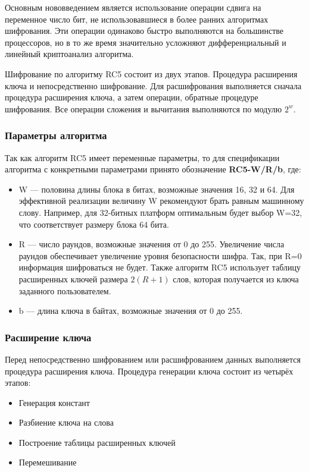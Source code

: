 \documentclass[a4paper]{report}
\begin{document}
Основным нововведением является использование операции сдвига на переменное число бит, не использовавшиеся в более ранних алгоритмах шифрования. Эти операции одинаково быстро выполняются на большинстве процессоров, но в то же время значительно усложняют дифференциальный и линейный криптоанализ алгоритма.

Шифрование по алгоритму RC5 состоит из двух этапов. Процедура расширения ключа и непосредственно шифрование. Для расшифрования выполняется сначала процедура расширения ключа, а затем операции, обратные процедуре шифрования. Все операции сложения и вычитания выполняются по модулю $\displaystyle 2^{w}$. 

\subsubsection{Параметры алгоритма}
Так как алгоритм RC5 имеет переменные параметры, то для спецификации алгоритма с конкретными параметрами принято обозначение \textbf{RC5-W/R/b}, где:
\begin{itemize}
\item W — половина длины блока в битах, возможные значения 16, 32 и 64. Для эффективной реализации величину W рекомендуют брать равным машинному слову. Например, для 32-битных платформ оптимальным будет выбор W=32, что соответствует размеру блока 64 бита.
\item R — число раундов, возможные значения от 0 до 255. Увеличение числа раундов обеспечивает увеличение уровня безопасности шифра. Так, при R=0 информация шифроваться не будет. Также алгоритм RC5 использует таблицу расширенных ключей размера $\displaystyle 2(R+1)$ слов, которая получается из ключа заданного пользователем.
\item b — длина ключа в байтах, возможные значения от 0 до 255.
\end{itemize} 


\subsubsection{Расширение ключа}
Перед непосредственно шифрованием или расшифрованием данных выполняется процедура расширения ключа. Процедура генерации ключа состоит из четырёх этапов: 

\begin{itemize}

\item Генерация констант
\item Разбиение ключа на слова
\item Построение таблицы расширенных ключей
\item Перемешивание

\end{itemize}
\end{document}
